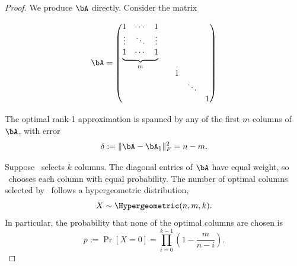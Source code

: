 \begin{proof}
    We produce $\bA$ directly. Consider the matrix

    \begin{equation} 
    \label{eq:rpcholesky-worst-case}
    \bA = 
    \begin{pmatrix}
        \underbrace{\begin{matrix}
        1 & \cdots & 1 \\
        \vdots& \ddots &\vdots\\
        1 & \cdots & 1 \\
        \end{matrix}}_{\text{$m$}}\\
        && 1 & \\
        && & \ddots \\
        && & & 1 \\
    \end{pmatrix}
    \end{equation}

    The optimal rank-1 approximation is spanned by any of the first $m$ columns of $\bA$, with error 
    \[\delta := \|\bA - \bA_1\|^2_F = n-m.\]
    
   Suppose \RPCholesky\ selects $k$ columns. The diagonal entries of $\bA$ have equal weight, so \RPCholesky\ chooses each column with equal probability. The number of optimal columns selected by \RPCholesky\ follows a hypergeometric distribution, 
   \[X\sim\Hypergeometric(n,m,k).\]
   In particular, the probability that none of the optimal columns are chosen is
   \[
       p := \Pr[X = 0] = \prod_{i=0}^{k-1}\left(1-\frac{m}{n-i}\right).
   \]


\end{proof}
